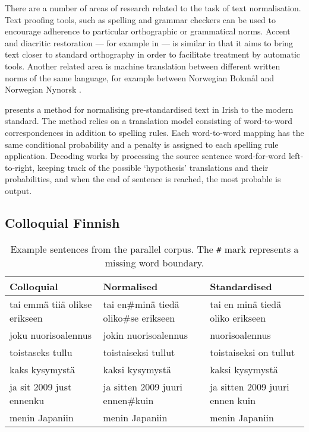 \documentclass[11pt]{article}
\begin{document}
There are a number of areas of research related to the task of text normalisation. Text
proofing tools, such as spelling and grammar checkers \cite{kukich1992} can be used to encourage adherence
to particular orthographic or grammatical norms. Accent and diacritic restoration --- for example in  --- is similar
in that it aims to bring text closer to standard orthography in order to facilitate treatment by 
automatic tools. Another related area is machine translation between different written norms of 
the same language, for example between Norwegian Bokm\aa{}l and Norwegian Nynorsk \cite{unhammer2009}.

 presents a method for normalising pre-standardised text in Irish to 
the modern standard. The method relies on a translation model consisting of word-to-word 
correspondences in addition to spelling rules. Each word-to-word mapping has the same
conditional probability and a penalty is assigned to each spelling rule application. Decoding
works by processing the source sentence word-for-word left-to-right, keeping track of the 
possible `hypothesis' translations and their probabilities, and when the end of 
sentence is reached, the most probable is output.

\subsection{Colloquial Finnish}


\begin{table*}
  \centering
  \begin{tabular}{|l|l|l|}
  \hline
  \textbf{Colloquial} & \textbf{Normalised} & \textbf{Standardised} \\
  \hline
  tai emm\"{a} tii\"{a} olikse erikseen & tai en\#min\"{a} tied\"{a} oliko\#se erikseen & tai en min\"{a} tied\"{a} oliko erikseen \\
  joku nuorisoalennus                             & jokin nuorisoalennus & nuorisoalennus \\
  \hline
   toistaseks tullu        & toistaiseksi tullut  & toistaiseksi on tullut  \\
   kaks kysymyst\"{a}       & kaksi kysymyst\"{a} & kaksi kysymyst\"{a} \\
  \hline
  ja sit 2009 just ennenku & ja sitten 2009 juuri ennen\#kuin  & ja sitten 2009 juuri ennen kuin  \\ 
menin Japaniin & menin Japaniin & menin Japaniin
 \\
  \hline
  \end{tabular}
  \caption{Example sentences from the parallel corpus. The \texttt{\#} mark represents a missing
    word boundary.}
  \label{table:corpexample}
\end{table*}
\end{document}
